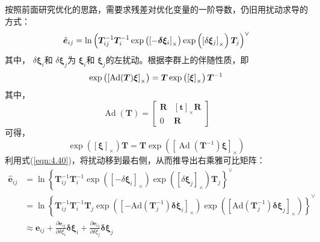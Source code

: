 按照前面研究优化的思路，需要求残差对优化变量的一阶导数，仍旧用扰动求导的方式：
\begin{equation}
\label{eqn:4.38}
\setlength{\abovedisplayskip}{6pt}
\setlength{\belowdisplayskip}{6pt}
\hat{\boldsymbol{e}}_{i j}=
\ln \left(\boldsymbol{T}_{i j}^{-1} \boldsymbol{T}_{i}^{-1} \exp \left(\left[-\boldsymbol{\delta} \boldsymbol{\xi}_{i}\right]_\times\right) 
\exp \left(\left[\delta \boldsymbol{\xi}_{j}\right]_\times\right) \boldsymbol{T}_{j}\right)^{\vee}
\end{equation}
其中， $\delta \bm{\xi}_{i} $和 $\delta \bm{\xi}_{j} $为 $\bm{\xi}_{i}  $和 $\bm{\xi}_{j}  $的左扰动。根据李群上的伴随性质，即
\begin{equation}
\label{eqn:4.39}
\setlength{\abovedisplayskip}{6pt}
\setlength{\belowdisplayskip}{6pt}
\exp \left(\left[\operatorname{Ad}(\boldsymbol{T}) \boldsymbol{\xi}\right]_\times\right)=
\boldsymbol{T} \exp \left( \left[\boldsymbol{\xi}\right]_\times\right) \boldsymbol{T}^{-1}
\end{equation}
其中，
\[\operatorname{Ad}(\boldsymbol{T})=\left[ \begin{array}{cc}{\boldsymbol{R}} & {\left[\boldsymbol{t}\right]_\times \boldsymbol{R}} \\ {0} & {\boldsymbol{R}}\end{array}\right]\]
可得，
\begin{equation}
\label{eqn:4.40}
\exp \left( \left[\boldsymbol{\xi}\right]_\times\right) \boldsymbol{T}=
\boldsymbol{T} \exp \left(\left[\operatorname{Ad}\left(\boldsymbol{T}^{-1}\right) \boldsymbol{\xi}\right]_\times\right)
\end{equation}
利用式(\ref{eqn:4.40})，将扰动移到最右侧，从而推导出右乘雅可比矩阵：
\begin{equation}
\label{eqn:4.41}
\begin{aligned} 
\hat{\bm{e}}_{i j} &=
\ln \left\{
\boldsymbol{T}_{i j}^{-1} \boldsymbol{T}_{i}^{-1} 
\exp \left( \left[-\delta \boldsymbol{\xi}_{i}\right]_\times \right) 
\exp \left( \left[\delta \boldsymbol{\xi}_{j}\right]_\times \right) \boldsymbol{T}_{j}
\right\}^{\vee} \\
&=
\ln \left\{
\boldsymbol{T}_{i j}^{-1} \boldsymbol{T}_{i}^{-1} \boldsymbol{T}_{j} 
\exp \left(
\left[-\mathrm{Ad}\left(\boldsymbol{T}_{j}^{-1}\right) \boldsymbol{\delta} \boldsymbol{\xi}_{i}\right]_\times
\right) 
\exp \left(
\left[\mathrm{A} \mathrm{d}\left(\boldsymbol{T}_{j}^{-1}\right) \boldsymbol{\delta} \boldsymbol{\xi}_{j}\right]_\times
\right)
\right\} ^ {\vee}\\
& \approx \boldsymbol{e}_{i j} + \frac{\partial \boldsymbol{e}_{i j}}{\partial \delta \xi_{i}} \boldsymbol{\delta} \boldsymbol{\xi}_{i} 
+ \frac{\partial \boldsymbol{e}_{i j}}{\partial \delta \xi_{j}} \boldsymbol{\delta} \boldsymbol{\xi}_{j}
\end{aligned}
\end{equation}
